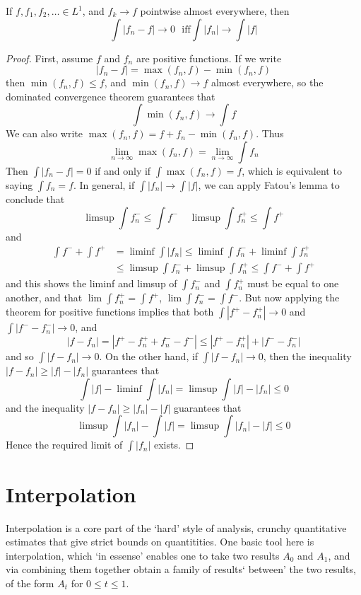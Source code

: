 \begin{lemma}[Scheffe]
    If $f, f_1, f_2, \dots \in L^1$, and $f_k \to f$ pointwise almost everywhere, then
    \[ \int |f_n - f| \to 0\ \ \ \text{iff} \int |f_n| \to \int |f| \]
\end{lemma}
\begin{proof}
    First, assume $f$ and $f_n$ are positive functions. If we write
    \[ |f_n - f| = \max(f_n,f) - \min(f_n,f) \]
    then $\min(f_n,f) \leq f$, and $\min(f_n,f) \to f$ almost everywhere, so the dominated convergence theorem guarantees that
    \[ \int \min(f_n,f) \to \int f \]
    We can also write $\max(f_n,f) = f + f_n - \min(f_n,f)$. Thus
    \[ \lim_{n \to \infty} \max(f_n,f) = \lim_{n \to \infty} \int f_n \]
    Then $\int |f_n - f| = 0$ if and only if $\int \max(f_n,f) = f$, which is equivalent to saying $\int f_n = f$. In general, if $\int |f_n| \to \int |f|$, we can apply Fatou's lemma to conclude that
    \[ \limsup \int f_n^- \leq \int f^-\ \ \ \ \ \limsup \int f_n^+ \leq \int f^+ \]
    and
    \begin{align*}
        \int f^- + \int f^+ &= \liminf \int |f_n| \leq \liminf \int f_n^- + \liminf \int f_n^+\\
        &\leq \limsup \int f_n^- + \limsup \int f_n^+ \leq \int f^- + \int f^+
    \end{align*}
    and this shows the liminf and limsup of $\int f_n^-$ and $\int f_n^+$ must be equal to one another, and that $\lim \int f_n^+ = \int f^+$, $\lim \int f_n^- = \int f^-$. But now applying the theorem for positive functions implies that both $\int |f^+ - f_n^+| \to 0$ and $\int |f^- - f_n^-| \to 0$, and
    \[ |f - f_n| = |f^+ - f_n^+ + f_n^- - f^-| \leq |f^+ - f_n^+| + |f^- - f_n^-| \]
    and so $\int |f - f_n| \to 0$. On the other hand, if $\int |f - f_n| \to 0$, then the inequality $|f - f_n| \geq |f| - |f_n|$ guarantees that
    \[ \int |f| - \liminf \int |f_n| = \limsup \int |f| - |f_n| \leq 0 \]
    and the inequality $|f - f_n| \geq |f_n| - |f|$ guarantees that
    \[ \limsup \int |f_n| - \int |f| = \limsup \int |f_n| - |f| \leq 0 \]
    Hence the required limit of $\int |f_n|$ exists.
\end{proof}

\chapter{Interpolation}

Interpolation is a core part of the `hard' style of analysis, crunchy quantitative estimates that give strict bounds on quantitities. One basic tool here is interpolation, which `in essense' enables one to take two results $A_0$ and $A_1$, and via combining them together obtain a family of results` between' the two results, of the form $A_t$ for $0 \leq t \leq 1$.


